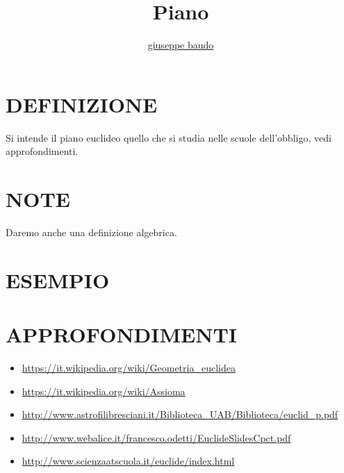 \documentclass[a4paper,10pt]{article}
\title{Piano}
\author{\href{http://www.baudo.hol.es}{giuseppe baudo}}
\begin{document}
\maketitle

\section{DEFINIZIONE}
Si intende il piano euclideo quello che si studia nelle scuole dell'obbligo, vedi approfondimenti.

\section{NOTE}
Daremo anche una definizione algebrica.

\section{ESEMPIO}

\section{APPROFONDIMENTI}
\begin{itemize}
 \item \url{https://it.wikipedia.org/wiki/Geometria_euclidea}
 \item \url{https://it.wikipedia.org/wiki/Assioma}
 \item \url{http://www.astrofilibresciani.it/Biblioteca_UAB/Biblioteca/euclid_p.pdf}
 \item \url{http://www.webalice.it/francesco.odetti/EuclideSlidesCpct.pdf}
 \item \url{http://www.scienzaatscuola.it/euclide/index.html}
\end{itemize}
\end{document}
